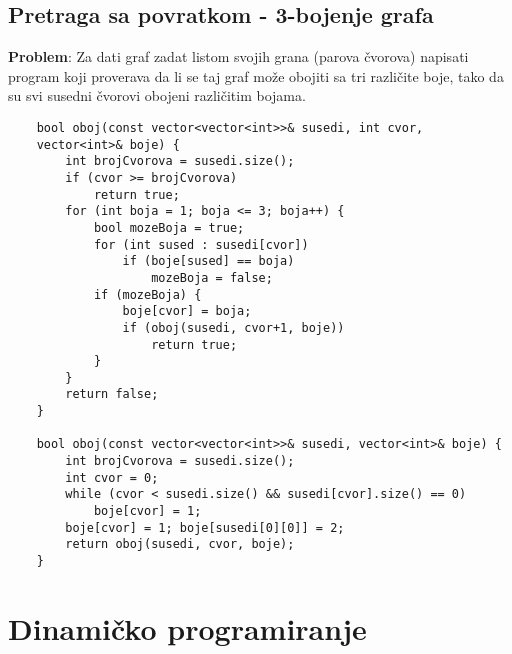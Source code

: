 \documentclass{article}
\begin{document}
\subsection{Pretraga sa povratkom - 3-bojenje grafa}
\textbf{Problem}: Za dati graf zadat listom svojih grana (parova čvorova) napisati
program koji proverava da li se taj graf može obojiti sa tri različite boje, tako
da su svi susedni čvorovi obojeni različitim bojama.
\begin{lstlisting}
    bool oboj(const vector<vector<int>>& susedi, int cvor, 
    vector<int>& boje) {
        int brojCvorova = susedi.size();
        if (cvor >= brojCvorova)
            return true;
        for (int boja = 1; boja <= 3; boja++) {
            bool mozeBoja = true;
            for (int sused : susedi[cvor])
                if (boje[sused] == boja)
                    mozeBoja = false;
            if (mozeBoja) {
                boje[cvor] = boja;
                if (oboj(susedi, cvor+1, boje))
                    return true;
            }
        }
        return false;
    }
    
    bool oboj(const vector<vector<int>>& susedi, vector<int>& boje) {
        int brojCvorova = susedi.size();
        int cvor = 0;
        while (cvor < susedi.size() && susedi[cvor].size() == 0)
            boje[cvor] = 1;
        boje[cvor] = 1; boje[susedi[0][0]] = 2;
        return oboj(susedi, cvor, boje);
    }
\end{lstlisting}
\newpage

\section{Dinamičko programiranje}
\end{document}
